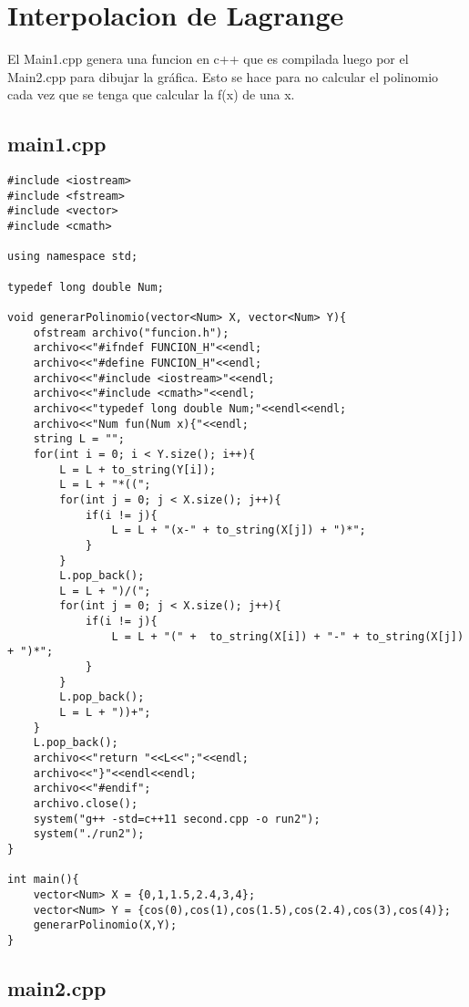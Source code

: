 \documentclass[a4paper,12pt]{article}
\begin{document}
\section{Interpolacion de Lagrange}

El Main1.cpp genera una funcion en c++ que es compilada luego por el Main2.cpp para dibujar la gráfica. Esto se hace para no calcular el polinomio cada
vez que se tenga que calcular la f(x) de una x.

\subsection{main1.cpp}

\begin{lstlisting}
#include <iostream>
#include <fstream>
#include <vector>
#include <cmath>

using namespace std;

typedef long double Num;

void generarPolinomio(vector<Num> X, vector<Num> Y){
	ofstream archivo("funcion.h");
	archivo<<"#ifndef FUNCION_H"<<endl;
	archivo<<"#define FUNCION_H"<<endl;
	archivo<<"#include <iostream>"<<endl;
	archivo<<"#include <cmath>"<<endl;
	archivo<<"typedef long double Num;"<<endl<<endl;
	archivo<<"Num fun(Num x){"<<endl;
	string L = "";
	for(int i = 0; i < Y.size(); i++){
		L = L + to_string(Y[i]);
		L = L + "*((";
		for(int j = 0; j < X.size(); j++){
			if(i != j){
				L = L + "(x-" + to_string(X[j]) + ")*";
			}
		}
		L.pop_back();
		L = L + ")/(";
		for(int j = 0; j < X.size(); j++){
			if(i != j){
				L = L + "(" +  to_string(X[i]) + "-" + to_string(X[j]) + ")*";
			}
		}
		L.pop_back();
		L = L + "))+";
	}
	L.pop_back();
	archivo<<"return "<<L<<";"<<endl;
	archivo<<"}"<<endl<<endl;
	archivo<<"#endif";
	archivo.close();
	system("g++ -std=c++11 second.cpp -o run2");
	system("./run2");
}

int main(){
	vector<Num> X = {0,1,1.5,2.4,3,4};
	vector<Num> Y = {cos(0),cos(1),cos(1.5),cos(2.4),cos(3),cos(4)};
	generarPolinomio(X,Y);
} 
\end{lstlisting}

\subsection{main2.cpp}
\end{document}
